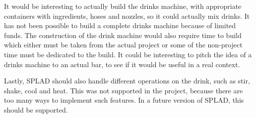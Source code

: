 It would be interesting to actually build the drinks machine, with appropriate containers with ingredients, hoses and nozzles, so it could actually mix drinks. It has not been possible to build a complete drinks machine because of limited funds. The construction of the drink machine would also require time to build which either must be taken from the actual project or some of the non-project time must be dedicated to the build. It could be interesting to pitch the idea of a drinks machine to an actual bar, to see if it would be useful in a real context.

Lastly, SPLAD should also handle different operations on the drink, such as stir, shake, cool and heat. This was not supported in the project, because there are too many ways to implement such features. In a future version of SPLAD, this should be supported.